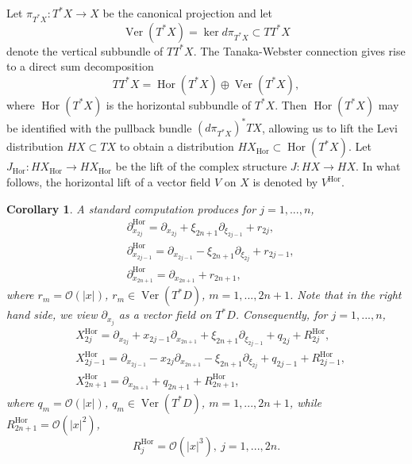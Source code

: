 \documentclass{article}
\newtheorem{corollary}[theorem]{Corollary}
\newcommand{\mco}{\mathcal O}
\DeclareMathOperator{\Hor}{Hor}
\DeclareMathOperator{\Ver}{Ver}
\begin{document}
%
Let $\pi_{T^*X} : T^*X \to X$ be the canonical projection and let $$\Ver(T^*X) = \ker d\pi_{T^*X}\subset T T^*X$$ denote the vertical subbundle of $TT^*X$.
The Tanaka-Webster connection gives rise to a direct sum decomposition $$T T^*X = \Hor(T^*X) \oplus \Ver(T^*X),$$
where $\Hor(T^*X)$ is the horizontal subbundle of $T^*X$. Then $\Hor(T^*X)$ may be identified with the pullback bundle $(d\pi_{T^*X})^* TX$, allowing us to lift the Levi distribution $HX \subset TX$ to obtain a distribution $H X_{\Hor} \subset \Hor(T^*X)$. Let $J_{\Hor} : HX_{\Hor}\to HX_{\Hor}$ be the lift of the complex structure $J : HX \to HX$. In what follows, the horizontal lift of a vector field $V$ on $X$ is denoted by $V^{\Hor}$.%
\begin{corollary} A standard computation produces for $j = 1,...,n$,$$\begin{aligned} &\partial_{x_{2j}}^{\Hor} = \partial_{x_{2j}} + \xi_{2n+1} \partial_{\xi_{2j-1}} + r_{2j},\\ &\partial_{x_{2j-1}}^{\Hor} = \partial_{x_{2j-1}} -\xi_{2n+1} \partial_{\xi_{2j}} + r_{2j-1},\\ &\partial_{x_{2n+1}}^{\Hor} = \partial_{x_{2n+1}} + r_{2n+1},\end{aligned}$$
where $r_m = \mco(|x|)$, $r_m \in \Ver(T^*D)$, $m = 1,...,2n+1$. Note that in the right hand side, we view $\partial_{x_j}$ as a vector field on $T^*D$. Consequently, for $j = 1,...,n$, $$\begin{aligned} &X_{2j}^{\Hor} = \partial_{x_{2j}} + x_{2j-1} \partial_{x_{2n+1}} + \xi_{2n+1} \partial_{\xi_{2j-1}} + q_{2j} + R_{2j}^{\Hor},\\ &X_{2j-1}^{\Hor} = \partial_{x_{2j-1}} - x_{2j} \partial_{x_{2n+1}} - \xi_{2n+1} \partial_{\xi_{2j}} + q_{2j-1} + R_{2j-1}^{\Hor},\\ & X_{2n+1}^{\Hor} = \partial_{x_{2n+1}} + q_{2n+1} + R_{2n+1}^{\Hor},\end{aligned}$$
where $q_m = \mco(|x|)$, $q_m \in \Ver(T^*D)$, $m = 1,...,2n+1$, while $R_{2n+1}^{\Hor} = \mco(|x|^2)$, $$R_j^{\Hor} = \mco(|x|^3),\ j = 1,...,2n.$$ \end{corollary}
%
\end{document}
